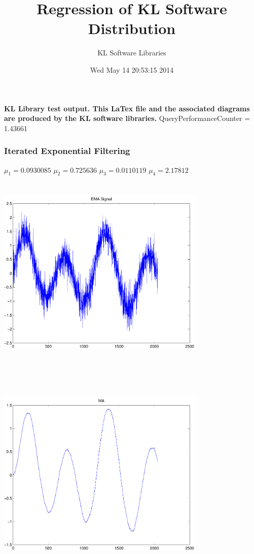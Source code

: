 \documentclass[9pt]{article}
\theoremstyle{plain}
\theoremstyle{definition}
\theoremstyle{remark}
\numberwithin{equation}{section}
\begin{document}
\title{Regression of KL Software Distribution   }
\author{KL Software Libraries}
\date{Wed May 14 20:53:15 2014
}
\maketitle
\textbf{ KL Library test output.  This LaTex file and the associated diagrams are produced by the KL software libraries.}
QueryPerformanceCounter  =  1.43661
\subsubsection{Iterated Exponential Filtering }
$\mu_1 =0.0930085$
$\mu_2 =0.725636$
$\mu_3 =0.0110119$
$\mu_4 =2.17812$
\includegraphics[width=10.0cm,height=10.0cm]{EMA_signal.pdf}

\includegraphics[width=10.0cm,height=10.0cm]{MA.pdf}
\end{document}
